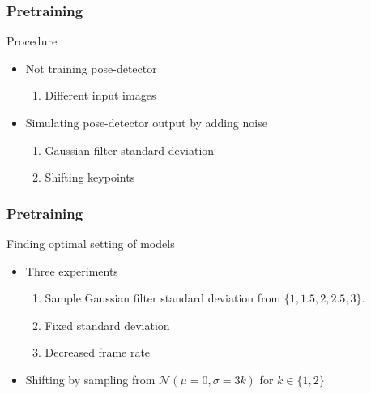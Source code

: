 \documentclass{beamer}
\begin{document}
\begin{frame}
    \frametitle{Pretraining}
    Procedure
    \begin{itemize}
        \item<1-> Not training pose-detector
        \begin{enumerate}
            \item Different input images
        \end{enumerate}
        \item<2-> Simulating pose-detector output by adding noise
        \begin{enumerate}
            \item Gaussian filter standard deviation
            \item Shifting keypoints
        \end{enumerate}
    \end{itemize}
\end{frame}

\begin{frame}
    \frametitle{Pretraining}
    Finding optimal setting of models
    \begin{itemize}
        \item<1-> Three experiments
        \begin{enumerate}
            \item<1-> Sample Gaussian filter standard deviation from $\{1, 1.5, 2, 2.5, 3\}$.
            \item<2-> Fixed standard deviation
            \item<3-> Decreased frame rate
        \end{enumerate}
        \item<4-> Shifting by sampling from $\mathcal{N}(\mu = 0, \sigma = 3k)$ for $k \in \{1, 2\}$
    \end{itemize}
\end{frame}
\end{document}
